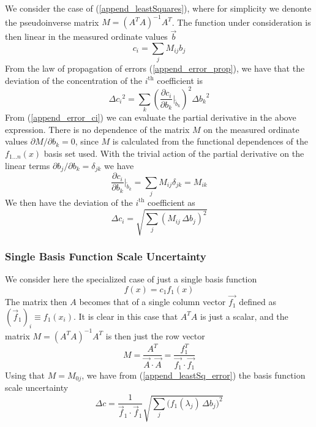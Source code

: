 We consider the case of (\ref{append_leastSquares}), where for simplicity we denonte the pseudoinverse matrix $M = \left(A^T A\right)^{-1} A^T$. The function under consideration is then linear in the measured ordinate values $\vec{b}$
\begin{equation} \label{append_error_ci}
	c_i = \sum_{j} M_{ij}b_j
\end{equation}
From the law of propagation of errors (\ref{append_error_prop}), we have that the deviation of the concentration of the $i^\mathrm{th}$ coefficient is
\begin{equation}
	\Delta {c_i}^2 = \sum_{k} \left(\frac{\partial c_i}{\partial b_k}\Bigg|_{\tilde{b}_k}\right)^2 \Delta {b_k}^2
\end{equation}
From (\ref{append_error_ci}) we can evaluate the partial derivative in the above expression. There is no dependence of the matrix $M$ on the measured ordinate values $\partial M / \partial b_k = 0$, since $M$ is calculated from the functional dependences of the $f_{1\ldots n}(x)$ basis set used. With the trivial action of the partial derivative on the linear terms $\partial b_j / \partial b_k = \delta_{jk}$ we have
\begin{equation}
	\frac{\partial c_i}{\partial b_k}\Bigg|_{\tilde{b}_k} = \sum_j M_{ij} \delta_{jk} = M_{ik}
\end{equation}
We then have the deviation of the $i^\mathrm{th}$ coefficient as
\begin{equation} \label{append_leastSq_error}
	\boxed{\Delta {c_i} = \sqrt{\sum_j \left(M_{ij} \, \Delta {b_j}\right)^2}}
\end{equation}


\subsubsection{Single Basis Function Scale Uncertainty}
We consider here the specialized case of just a single basis function
$$f(x) = c_1 f_1(x)$$
The matrix then $A$ becomes that of a single column vector $\vec{f_1}$ defined as $\left(\vec{f}_1\right)_i \equiv f_1(x_i)$. It is clear in this case that $A^T A$ is just a scalar, and the matrix $M = \left(A^T A\right)^{-1} A^T$ is then just the row vector
\begin{equation}
	M = \frac{A^T}{\vec{A}\cdot \vec{A}} = \frac{f_1^T}{\vec{f_1}\cdot\vec{f_1}}
\end{equation}
Using that $M=M_{0j}$, we have from (\ref{append_leastSq_error}) the basis function scale uncertainty
\begin{equation}\label{append_error_one_general}
	\Delta c = \frac{1}{\vec{f}_1\cdot\vec{f}_1} \sqrt{\sum_j \Big(f_1(\lambda_j) \, \Delta b_j\Big)^2}
\end{equation}

